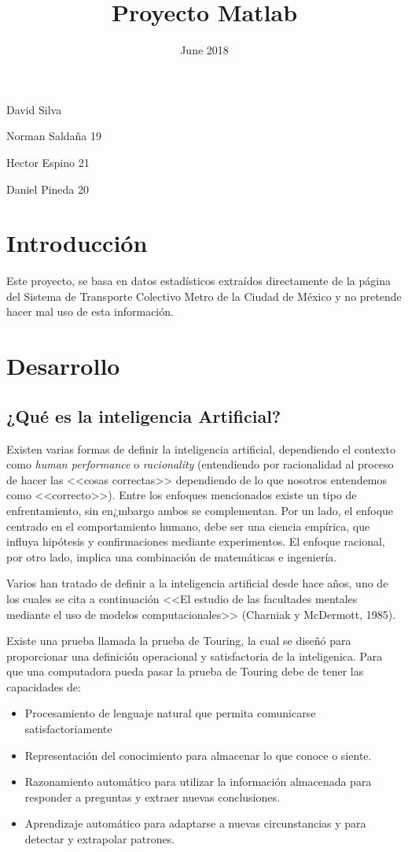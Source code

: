 \documentclass{article}
\title{Proyecto Matlab}
\date{June 2018}
\begin{document}
\maketitle
\begin{center}
David Silva

Norman Saldaña 19

Hector Espino 21

Daniel Pineda 20
\end{center}
\section{Introducción}
Este proyecto, se basa en datos estadísticos extraídos directamente de la página del Sistema de Transporte Colectivo Metro de la Ciudad de México y no pretende hacer mal uso de esta información.

\section{Desarrollo}
\subsection{¿Qué es la inteligencia Artificial?}
Existen varias formas de definir la inteligencia artificial, dependiendo el contexto como \textit{human performance} o \textit{racionality} (entendiendo por racionalidad al proceso de hacer las <<cosas correctas>> dependiendo de lo que nosotros entendemos como <<correcto>>). Entre los enfoques mencionados existe un tipo de enfrentamiento, sin en¿mbargo ambos se complementan. Por un lado, el enfoque centrado en el comportamiento humano, debe ser una ciencia empírica, que influya hipótesis y confirmaciones mediante experimentos. El enfoque racional, por otro lado, implica una combinación de matemáticas e ingeniería.

Varios han tratado de definir a la inteligencia artificial desde hace años, uno de los cuales se cita a continuación <<El estudio de las facultades mentales mediante el uso de modelos computacionales>> (Charniak y McDermott, 1985).

Existe una prueba llamada la prueba de Touring, la cual se diseñó para proporcionar una definición operacional y satisfactoria de la inteligenica. Para que una computadora pueda pasar la prueba de Touring debe de tener las capacidades de:

\begin{itemize}
    \item Procesamiento de lenguaje natural que permita comunicarse satisfactoriamente
    \item Representación del conocimiento para almacenar lo que conoce o siente.
    \item Razonamiento automático para utilizar la información almacenada para responder a preguntas y extraer nuevas conclusiones.
    \item Aprendizaje automático para adaptarse a nuevas circunstancias y para detectar y extrapolar patrones.
\end{itemize}
\end{document}
